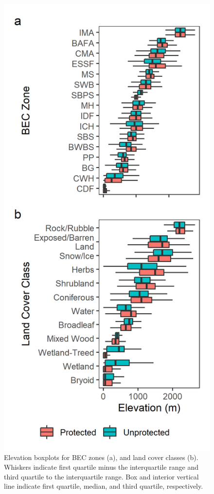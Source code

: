\documentclass[11pt]{article}
\makeatletter
\def\maxwidth{\ifdim\Gin@nat@width>\linewidth\linewidth
\else\Gin@nat@width\fi}
\let\Oldincludegraphics\includegraphics
\renewcommand{\includegraphics}[1]{\Oldincludegraphics[width=\maxwidth]{#1}}
\makeatother
\begin{document}
\begin{figure}
\hypertarget{fig:elev-boxplots}{%
\centering
\includegraphics{figures/elev_boxplots.png}
\caption{Elevation boxplots for BEC zones (a), and land cover classes
(b). Whiskers indicate first quartile minus the interquartile range and
third quartile to the interquartile range. Box and interior vertical
line indicate first quartile, median, and third quartile,
respectively.}\label{fig:elev-boxplots}
}
\end{figure}
\end{document}
